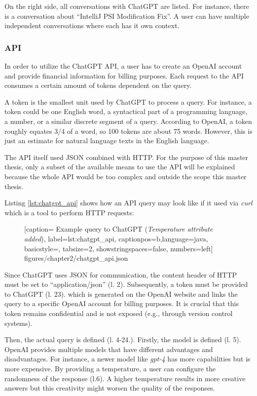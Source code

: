 On the right side, all conversations with ChatGPT are listed. For instance, there is a conversation about \enquote{IntelliJ PSI Modification Fix}. A user can have multiple independent conversations where each has it own context. 

\subsubsection{API}
In order to utilize the ChatGPT \ac{API}, a user has to create an OpenAI account and provide financial information for billing purposes. Each request to the API consumes a certain amount of tokens dependent on the query. 

A token is the smallest unit used by ChatGPT to process a query. For instance, a token could be one English word, a syntactical part of a programming language, a number, or a similar discrete segment of a query. According to OpenAI, a token roughly equates 3/4 of a word, so 100 tokens are about 75 words. However, this is just an estimate for natural language texts in the English language. 

The \ac{API} itself used JSON combined with \ac{HTTP}. For the purpose of this master thesis, only a subset of the available means to use the \ac{API} will be explained because the whole \ac{API} would be too complex and outside the scope this master thesis. 

Listing \ref{lst:chatgpt_api} shows how an \ac{API} query may look like if it used via \textit{curl} which is a tool to  perform \ac{HTTP} requests:
 \begin{figure} [htbp!]
			
			[caption={ Example query to ChatGPT  \cite{ChatGPT_url} (\textit{Temperature attribute added})}, 
			label={lst:chatgpt_api},
			captionpos=b,language=java, basicstyle=\footnotesize, tabsize=2, showstringspaces=false,  numbers=left]
			{figures/chapter2/chatgpt_api.json}
		\end{figure}
 

Since ChatGPT uses \ac{JSON} for communication, the content header of \ac{HTTP}  must be set to \enquote{application/json} (l. 2). Subsequently, a token must be provided to ChatGPT (l. 23). which is generated on the OpenAI website and links the query to a specific OpenAI account for billing purposes. It is crucial that this token remains confidential and is not exposed (e.g., through version control systems).

Then, the actual query is defined (l. 4-24.). Firstly, the model is defined (l. 5). OpenAI provides multiple models that have different advantages and disadvantages. For instance, a newer model like \textit{gpt-4} has more capabilities but is more expensive.  By providing a temperature, a user can configure the randomness of the response (l.6). A higher temperature results in more creative answers but this creativity might worsen the quality of the responses. 

